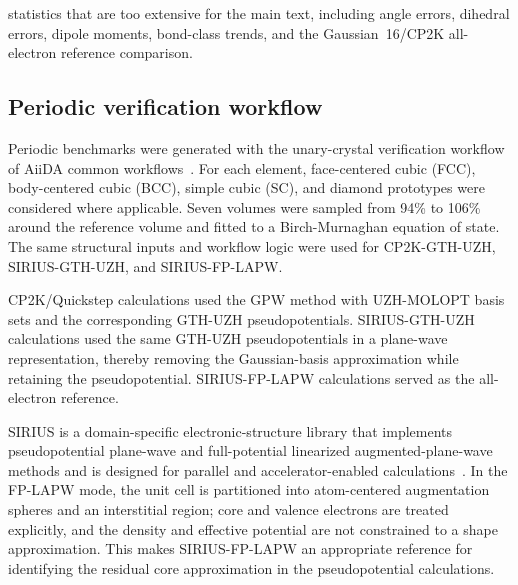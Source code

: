 \documentclass[aps,prb,reprint,amsmath,amssymb,superscriptaddress,longbibliography,floatfix]{revtex4-2}
\begin{document}
statistics that are too extensive for the main text, including angle errors, dihedral errors, dipole moments, bond-class trends, and the Gaussian~16/CP2K all-electron reference comparison.

\subsection{Periodic verification workflow}

Periodic benchmarks were generated with the unary-crystal verification workflow of AiiDA common workflows~\cite{Huber2021,Bosoni2024}. For each element, face-centered cubic (FCC), body-centered cubic (BCC), simple cubic (SC), and diamond prototypes were considered where applicable. Seven volumes were sampled from 94\% to 106\% around the reference volume and fitted to a Birch-Murnaghan equation of state. The same structural inputs and workflow logic were used for CP2K-GTH-UZH, SIRIUS-GTH-UZH, and SIRIUS-FP-LAPW.

CP2K/Quickstep calculations used the GPW method with UZH-MOLOPT basis sets and the corresponding GTH-UZH pseudopotentials. SIRIUS-GTH-UZH calculations used the same GTH-UZH pseudopotentials in a plane-wave representation, thereby removing the Gaussian-basis approximation while retaining the pseudopotential. SIRIUS-FP-LAPW calculations served as the all-electron reference.

SIRIUS is a domain-specific electronic-structure library that implements pseudopotential plane-wave and full-potential linearized augmented-plane-wave methods and is designed for parallel and accelerator-enabled calculations~\cite{Zhang2022Computation,Zhang2023Sirius,SiriusDocs}. In the FP-LAPW mode, the unit cell is partitioned into atom-centered augmentation spheres and an interstitial region; core and valence electrons are treated explicitly, and the density and effective potential are not constrained to a shape approximation. This makes SIRIUS-FP-LAPW an appropriate reference for identifying the residual core approximation in the pseudopotential calculations.
\end{document}
